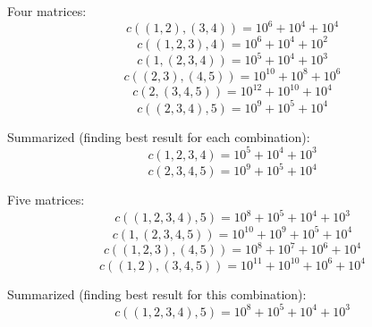 Four matrices:
\[c((1,2),(3,4))=10^6+10^4+10^4\]
\[c((1,2,3),4)=10^6+10^4+10^2\]
\[c(1,(2,3,4))=10^5+10^4+10^3\]
\[c((2,3),(4,5))=10^{10}+10^8+10^6\]
\[c(2,(3,4,5))=10^{12}+10^{10}+10^4\]
\[c((2,3,4),5)=10^9+10^5+10^4\]

Summarized (finding best result for each combination):
\[c(1,2,3,4)=10^5+10^4+10^3\]
\[c(2,3,4,5)=10^9+10^5+10^4\]

Five matrices:
\[c((1,2,3,4),5)=10^8+10^5+10^4+10^3\]
\[c(1,(2,3,4,5))=10^{10}+10^9+10^5+10^4\]
\[c((1,2,3),(4,5))=10^8+10^7+10^6+10^4\]
\[c((1,2),(3,4,5))=10^{11}+10^{10}+10^6+10^4\]

Summarized (finding best result for this combination): 
\[c((1,2,3,4),5)=10^8+10^5+10^4+10^3\]

